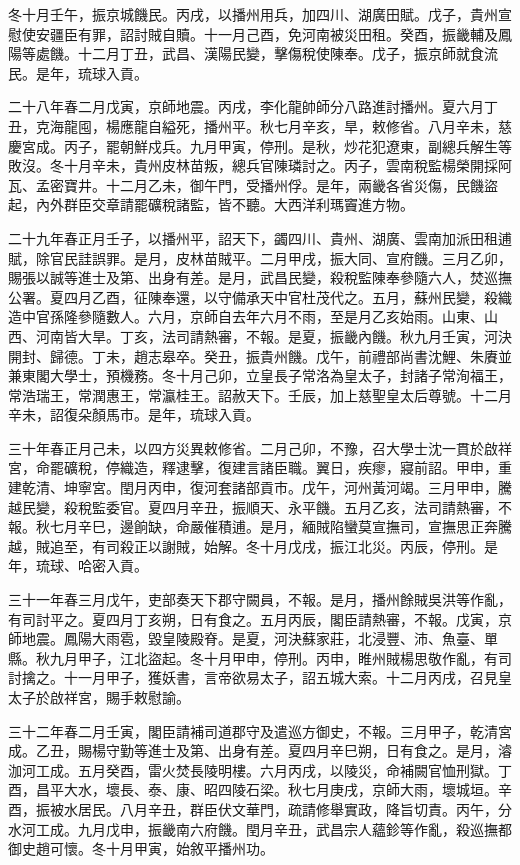 \begin{pinyinscope}
冬十月壬午，振京城饑民。丙戌，以播州用兵，加四川、湖廣田賦。戊子，貴州宣慰使安疆臣有罪，詔討賊自贖。十一月己酉，免河南被災田租。癸酉，振畿輔及鳳陽等處饑。十二月丁丑，武昌、漢陽民變，擊傷稅使陳奉。戊子，振京師就食流民。是年，琉球入貢。

二十八年春二月戊寅，京師地震。丙戌，李化龍帥師分八路進討播州。夏六月丁丑，克海龍囤，楊應龍自縊死，播州平。秋七月辛亥，旱，敕修省。八月辛未，慈慶宮成。丙子，罷朝鮮戍兵。九月甲寅，停刑。是秋，炒花犯遼東，副總兵解生等敗沒。冬十月辛未，貴州皮林苗叛，總兵官陳璘討之。丙子，雲南稅監楊榮開採阿瓦、孟密寶井。十二月乙未，御午門，受播州俘。是年，兩畿各省災傷，民饑盜起，內外群臣交章請罷礦稅諸監，皆不聽。大西洋利瑪竇進方物。

二十九年春正月壬子，以播州平，詔天下，蠲四川、貴州、湖廣、雲南加派田租逋賦，除官民詿誤罪。是月，皮林苗賊平。二月甲戌，振大同、宣府饑。三月乙卯，賜張以誠等進士及第、出身有差。是月，武昌民變，殺稅監陳奉參隨六人，焚巡撫公署。夏四月乙酉，征陳奉還，以守備承天中官杜茂代之。五月，蘇州民變，殺織造中官孫隆參隨數人。六月，京師自去年六月不雨，至是月乙亥始雨。山東、山西、河南皆大旱。丁亥，法司請熱審，不報。是夏，振畿內饑。秋九月壬寅，河決開封、歸德。丁未，趙志皋卒。癸丑，振貴州饑。戊午，前禮部尚書沈鯉、朱賡並兼東閣大學士，預機務。冬十月己卯，立皇長子常洛為皇太子，封諸子常洵福王，常浩瑞王，常潤惠王，常瀛桂王。詔赦天下。壬辰，加上慈聖皇太后尊號。十二月辛未，詔復朵顏馬市。是年，琉球入貢。

三十年春正月己未，以四方災異敕修省。二月己卯，不豫，召大學士沈一貫於啟祥宮，命罷礦稅，停織造，釋逮擊，復建言諸臣職。翼日，疾瘳，寢前詔。甲申，重建乾清、坤寧宮。閏月丙申，復河套諸部貢市。戊午，河州黃河竭。三月甲申，騰越民變，殺稅監委官。夏四月辛丑，振順天、永平饑。五月乙亥，法司請熱審，不報。秋七月辛巳，邊餉缺，命嚴催積逋。是月，緬賊陷蠻莫宣撫司，宣撫思正奔騰越，賊追至，有司殺正以謝賊，始解。冬十月戊戌，振江北災。丙辰，停刑。是年，琉球、哈密入貢。

三十一年春三月戊午，吏部奏天下郡守闕員，不報。是月，播州餘賊吳洪等作亂，有司討平之。夏四月丁亥朔，日有食之。五月丙辰，閣臣請熱審，不報。戊寅，京師地震。鳳陽大雨雹，毀皇陵殿脊。是夏，河決蘇家莊，北浸豐、沛、魚臺、單縣。秋九月甲子，江北盜起。冬十月甲申，停刑。丙申，睢州賊楊思敬作亂，有司討擒之。十一月甲子，獲妖書，言帝欲易太子，詔五城大索。十二月丙戌，召見皇太子於啟祥宮，賜手敕慰諭。

三十二年春二月壬寅，閣臣請補司道郡守及遣巡方御史，不報。三月甲子，乾清宮成。乙丑，賜楊守勤等進士及第、出身有差。夏四月辛巳朔，日有食之。是月，濬泇河工成。五月癸酉，雷火焚長陵明樓。六月丙戌，以陵災，命補闕官恤刑獄。丁酉，昌平大水，壞長、泰、康、昭四陵石梁。秋七月庚戌，京師大雨，壞城垣。辛酉，振被水居民。八月辛丑，群臣伏文華門，疏請修舉實政，降旨切責。丙午，分水河工成。九月戊申，振畿南六府饑。閏月辛丑，武昌宗人蘊鉁等作亂，殺巡撫都御史趙可懷。冬十月甲寅，始敘平播州功。


\end{pinyinscope}

